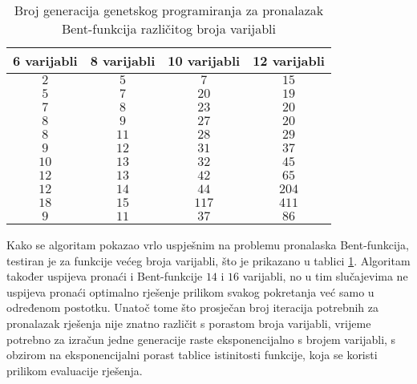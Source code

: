 \begin{table}[]
    \centering
    \captionsetup{justification=centering}
    \caption{Broj generacija genetskog programiranja za pronalazak Bent-funkcija različitog broja varijabli}
    \begin{tabular}{cccc} \hline
        6 varijabli & 8 varijabli & 10 varijabli & 12 varijabli \\ \hline
         $2$ &  $5$ &   $7$ &  $15$ \\
         $5$ &  $7$ &  $20$ &  $19$ \\
         $7$ &  $8$ &  $23$ &  $20$ \\
         $8$ &  $9$ &  $27$ &  $20$ \\
         $8$ & $11$ &  $28$ &  $29$ \\
         $9$ & $12$ &  $31$ &  $37$ \\
        $10$ & $13$ &  $32$ &  $45$ \\
        $12$ & $13$ &  $42$ &  $65$ \\
        $12$ & $14$ &  $44$ & $204$ \\
        $18$ & $15$ & $117$ & $411$ \\ \hline
         $9$ & $11$ &  $37$ &  $86$
    \end{tabular}
    \label{tbl:gp_bent}
\end{table}
Kako se algoritam pokazao vrlo uspješnim na problemu pronalaska Bent-funkcija, testiran je za funkcije većeg broja varijabli, što je prikazano u tablici \ref{tbl:gp_bent}.
Algoritam također uspijeva pronaći i Bent-funkcije $14$ i $16$ varijabli, no u tim slučajevima ne uspijeva pronaći optimalno rješenje prilikom svakog pokretanja već samo u određenom postotku.
Unatoč tome što prosječan broj iteracija potrebnih za pronalazak rješenja nije znatno različit s porastom broja varijabli, vrijeme potrebno za izračun jedne generacije raste eksponencijalno s brojem varijabli, s obzirom na eksponencijalni porast tablice istinitosti funkcije, koja se koristi prilikom evaluacije rješenja.

